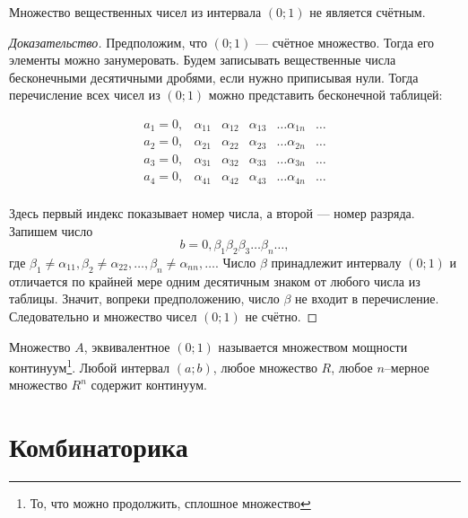 \begin{theorem}
	Множество вещественных чисел из интервала $(0; 1)$ не является счётным.

	\begin{proof}[Доказательство]
		Предположим, что $(0;1)$ --- счётное множество. Тогда его элементы можно
		занумеровать. Будем записывать вещественные числа бесконечными десятичными
		дробями, если нужно приписывая нули. Тогда перечисление всех чисел из
		$(0;1)$ можно представить бесконечной таблицей:

		\[
			\begin{matrix}
				a_1 = 0,    & \alpha_{11} & \alpha_{12} & \alpha_{13} & \ldots
				\alpha_{1n} & \ldots                                           \\
				a_2 = 0,    & \alpha_{21} & \alpha_{22} & \alpha_{23} & \ldots
				\alpha_{2n} & \ldots                                           \\
				a_3 = 0,    & \alpha_{31} & \alpha_{32} & \alpha_{33} & \ldots
				\alpha_{3n} & \ldots                                           \\
				a_4 = 0,    & \alpha_{41} & \alpha_{42} & \alpha_{43} & \ldots
				\alpha_{4n} & \ldots                                           \\
			\end{matrix}
		\]

		Здесь первый индекс показывает номер числа, а второй --- номер
		разряда. Запишем число
		\[
			b = 0, \beta_1 \beta_2 \beta_3 \dots \beta_n \dots
			,\]
		где $\beta_1 \neq \alpha_{11}, \beta_2 \neq \alpha_{22}, \dots,
			\beta_n \neq \alpha_{nn}, \dots$. Число $\beta$ принадлежит
		интервалу $(0;1)$ и отличается по крайней мере одним десятичным
		знаком от любого числа из таблицы. Значит, вопреки предположению,
		число $\beta$ не входит в перечисление. Следовательно и множество
		чисел $(0;1)$ не счётно.
	\end{proof}
\end{theorem}

Множество $A$, эквивалентное $(0;1)$ называется множеством мощности
континуум\footnote{То, что можно продолжить, сплошное
	множество}. Любой интервал $(a;b)$, любое множество $R$, любое $n$--мерное
множество $R^n$ содержит континуум.

\chapter{Комбинаторика}

